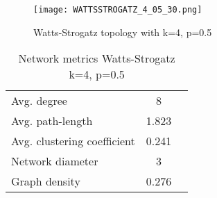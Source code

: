\documentclass[Bachelorarbeit.tex]{subfiles}
\begin{document}
\begin{figure}[H]
	\centering
  \texttt{[image: WATTSSTROGATZ\_4\_05\_30.png]}
	\caption{Watts-Strogatz topology with k=4, p=0.5}
	\label{fig1}
\end{figure}

\begin{table}[h]
	\centering
	\caption{Network metrics Watts-Strogatz k=4, p=0.5}
	\begin{tabular} { l c r }
		\hline
		Avg. degree & 8 \\
		Avg. path-length & 1.823 \\
		Avg. clustering coefficient & 0.241 \\
		Network diameter & 3 \\
		Graph density & 0.276 \\
		\hline
	\end{tabular}
\end{table}
\end{document}
